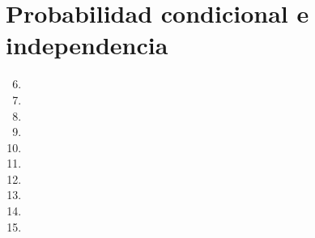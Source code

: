 \section{Probabilidad condicional e independencia}
\begin{enumerate}
	\setcounter{enumi}{5}
	\item
	\item
	\item
	\item
	\item
	\item
	\item
	\item
	\item
	\item
\end{enumerate}
